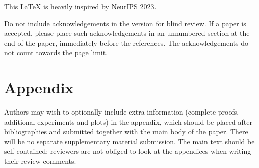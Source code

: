 \documentclass{article}
\begin{document}
This \LaTeX{} is heavily inspired by NeurIPS 2023.

Do not include acknowledgements in the version for blind review.
If a paper is accepted, please place such acknowledgements in an unnumbered section at the end of the paper, immediately before the references.
The acknowledgements do not count towards the page limit.









\appendix
\section{Appendix}

Authors may wish to optionally include extra information (complete proofs, additional experiments and plots) in the appendix, which should be placed after bibliographies and submitted together with the main body of the paper. There will be no separate supplementary material submission.
The main text should be self-contained; reviewers are not obliged to look at the appendices when writing their review comments.
\end{document}
